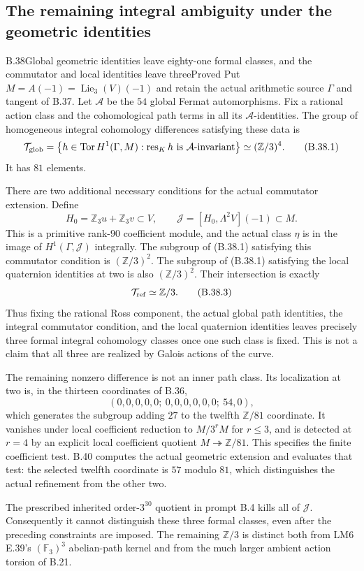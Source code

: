 \subsection{The remaining integral ambiguity under the geometric identities}

\begin{statement}{B.38}{Global geometric identities leave eighty-one formal classes, and the commutator and local identities leave three}{Proved}
Put $M=A(-1)=\operatorname{Lie}_3(V)(-1)$ and retain the
actual arithmetic source $\Gamma$ and tangent of B.37.
Let $\mathcal A$ be the $54$ global Fermat automorphisms.
Fix a rational action class and the cohomological path
terms in all its $\mathcal A$-identities. The group of
homogeneous integral cohomology differences satisfying
these data is
\[
 \mathcal T_{\rm glob}
   =\bigl\{h\in\operatorname{Tor}H^1(\Gamma,M):
         \operatorname{res}_K h\text{ is }\mathcal A\text{-invariant}\bigr\}
       \simeq(\mathbb Z/3)^4.                               \tag{B.38.1}
\]
It has $81$ elements.

There are two additional necessary conditions for the
actual commutator extension. Define
\[
 H_0=\mathbb Z_3u+\mathbb Z_3v\subset V,
 \qquad\mathcal J=[H_0,\Lambda^2V](-1)\subset M.
                                                               \tag{B.38.2}
\]
This is a primitive rank-$90$ coefficient module, and
the actual class $\eta$ is in the image of
$H^1(\Gamma,\mathcal J)$ integrally.
The subgroup of (B.38.1) satisfying this commutator
condition is $(\mathbb Z/3)^2$.
The subgroup of (B.38.1) satisfying the local quaternion
identities at two is also $(\mathbb Z/3)^2$.
Their intersection is exactly
\[
                           \mathcal T_{\rm ref}\simeq\mathbb Z/3.
                                                               \tag{B.38.3}
\]
Thus fixing the rational Ross component, the actual
global path identities, the integral commutator condition,
and the local quaternion identities leaves precisely
three formal integral cohomology classes once one such
class is fixed. This is not a claim that all three are
realized by Galois actions of the curve.

The remaining nonzero difference is not an inner path
class. Its localization at two is, in the thirteen
coordinates of B.36,
\[
             (0,0,0,0,0;\ 0,0,0,0,0,0;\ 54,0),             \tag{B.38.4}
\]
which generates the subgroup adding $27$ to the twelfth
$\mathbb Z/81$ coordinate.
It vanishes under local coefficient reduction to
$M/3^rM$ for $r\le3$, and is detected at $r=4$ by an
explicit local coefficient quotient $M\twoheadrightarrow\mathbb Z/81$.
This specifies the finite coefficient test. B.40 computes
the actual geometric extension and evaluates that test:
the selected twelfth coordinate is $57$ modulo $81$,
which distinguishes the actual refinement from the other two.

The prescribed inherited order-$3^{30}$ quotient in
prompt B.4 kills all of $\mathcal J$. Consequently it
cannot distinguish these three formal classes, even
after the preceding constraints are imposed.
The remaining $\mathbb Z/3$ is distinct both from
LM6 E.39's $(\mathbb F_3)^3$ abelian-path kernel and
from the much larger ambient action torsion of B.21.
\end{statement}
